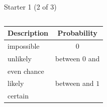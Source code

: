 \documentclass{beamer}
\renewcommand{\arraystretch}{0.92}
\newcommand{\ablank}[1]{%
  \alt<2>{\textcolor{red}{#1}}{\underline{\phantom{#1}}}%
}
\newcommand{\ealkey}[1]{\textcolor{ealkeycolour}{#1}}
\begin{document}
\begin{frame}[t]{Starter 1 (2 of 3)}
\begin{columns}[T]
\begin{enumerate}
        \begin{center}
        {\scriptsize\renewcommand{\arraystretch}{0.92}\setlength{\tabcolsep}{5pt}
        \begin{tabular}{l|c}
          Description & \ealkey{Probability}\\ \hline
          \ealkey{impossible}  & $0$\\
          \ealkey{unlikely}    & between $0$ and \ablank{$0.5$}\\
          \ealkey{even chance} & \ablank{$0.5$}\\
          \ealkey{likely}      & between \ablank{$0.5$} and $1$\\
          \ealkey{certain}     & \ablank{$1$}
        \end{tabular}}
        \end{center}
\end{enumerate}
\end{columns}
\end{frame}
\end{document}
